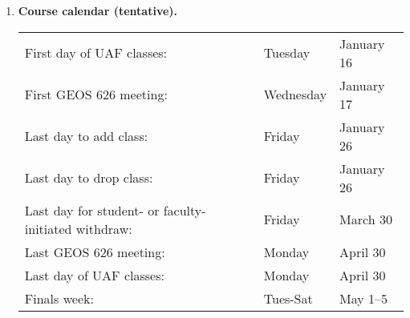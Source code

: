 \documentclass[10pt,titlepage,fleqn]{article}
\begin{document}
\begin{enumerate}

\item {\bf Course calendar (tentative).}


\begin{tabular}{lll}
\hline
First day of UAF classes:                           & Tuesday & January 16 \\
First GEOS 626 meeting:                             & Wednesday & January 17 \\
Last day to add class:                              & Friday & January 26 \\
Last day to drop class:                             & Friday & January 26 \\
Last day for student- or faculty-initiated withdraw: & Friday & March 30 \\
Last GEOS 626 meeting:                              & Monday & April 30 \\
Last day of UAF classes:                            & Monday & April 30 \\
Finals week:                                        & Tues-Sat & May 1--5 \\
\hline
\end{tabular}

\pagebreak


\end{enumerate}
\end{document}
